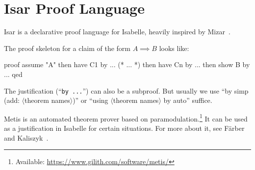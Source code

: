 \section{Isar Proof Language}

\begin{node}\label{isabelle:isar-0000}%
Isar is a declarative proof language for Isabelle, heavily inspired by
Mizar~.
\end{node}

\begin{node}\label{isabelle:isar-0001}%
  The proof skeleton for a claim of the form $A\implies B$ looks like:
\begin{Isabelle}
proof
  assume "A"
  then have C1 by ...
  (* ... *)
  then have Cn by ...
  then show B by ...
qed
\end{Isabelle}

\begin{node}\label{isabelle:isar-0002}%
The justification (``\texttt{by ...}'') can also be a subproof. But
usually we use ``by simp (add: $\langle$theorem names$\rangle$)'' or
``using $\langle$theorem names$\rangle$ by auto'' suffice.

\begin{node}[Metis]\label{isabelle:isar-0003}%
Metis%
is an automated theorem prover based on
paramodulation.\footnote{Available: \url{https://www.gilith.com/software/metis/}}
It can be used as a justification in Isabelle for certain situations. 
For more about it, see F{\"{a}}rber and Kaliszyk~\cite{farber2015metis}.
\end{node}
\end{node}
\end{node}